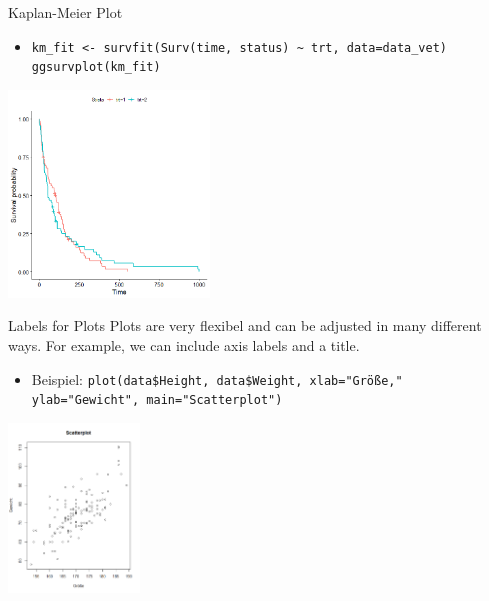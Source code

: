 \documentclass[aspectratio = 169]{chariteBeamer}
\begin{document}
\begin{frame}[fragile]{Kaplan-Meier Plot}
	\begin{itemize}
		\item \verb+km_fit <- survfit(Surv(time, status) ~ trt, data=data_vet)+ \\ \verb+ggsurvplot(km_fit)+
	\end{itemize}
			
	\begin{center}
		\includegraphics[height=5.5cm]{KM3}
	\end{center}
\end{frame}

\begin{frame}[fragile]{Labels for Plots}
	Plots are very flexibel and can be adjusted in many different ways. For example, we can include axis labels and a title.
	\begin{itemize}
		\item Beispiel: \verb+plot(data$Height, data$Weight, xlab="Größe,"+
		\verb+            ylab="Gewicht", main="Scatterplot")+
	\end{itemize}
			
	\begin{center}
		\includegraphics[height=4.5cm]{AnnotatedPlot}
	\end{center}
\end{frame}
\end{document}
